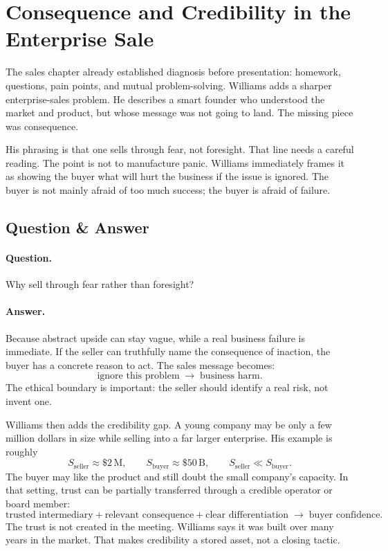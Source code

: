 \documentclass[11pt,oneside]{book}
\begin{document}
\section{Consequence and Credibility in the Enterprise Sale}

The sales chapter already established diagnosis before presentation: homework, questions, pain points, and mutual problem-solving. Williams adds a sharper enterprise-sales problem. He describes a smart founder who understood the market and product, but whose message was not going to land. The missing piece was consequence.

His phrasing is that one sells through fear, not foresight. That line needs a careful reading. The point is not to manufacture panic. Williams immediately frames it as showing the buyer what will hurt the business if the issue is ignored. The buyer is not mainly afraid of too much success; the buyer is afraid of failure.

\subsection{Question \& Answer}

\paragraph{Question.}
Why sell through fear rather than foresight?

\paragraph{Answer.}
Because abstract upside can stay vague, while a real business failure is immediate. If the seller can truthfully name the consequence of inaction, the buyer has a concrete reason to act. The sales message becomes:
\[
\text{ignore this problem}
\;\longrightarrow\;
\text{business harm}.
\]
The ethical boundary is important: the seller should identify a real risk, not invent one.

Williams then adds the credibility gap. A young company may be only a few million dollars in size while selling into a far larger enterprise. His example is roughly
\[
S_{\mathrm{seller}}\approx \$2\,\mathrm{M},
\qquad
S_{\mathrm{buyer}}\approx \$50\,\mathrm{B},
\qquad
S_{\mathrm{seller}}\ll S_{\mathrm{buyer}}.
\]
The buyer may like the product and still doubt the small company's capacity. In that setting, trust can be partially transferred through a credible operator or board member:
\[
\text{trusted intermediary}
+
\text{relevant consequence}
+
\text{clear differentiation}
\;\longrightarrow\;
\text{buyer confidence}.
\]
The trust is not created in the meeting. Williams says it was built over many years in the market. That makes credibility a stored asset, not a closing tactic.
\end{document}
